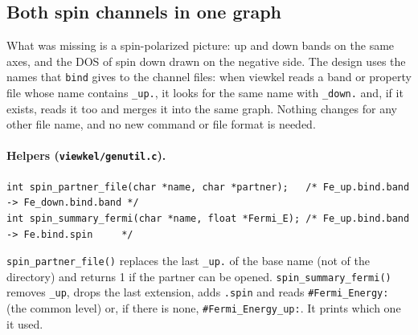 \documentclass[11pt,a4paper]{article}
\newcommand{\file}[1]{\texttt{#1}}
\newcommand{\fn}[1]{\texttt{#1()}}
\begin{document}
\subsection{Both spin channels in one graph}

What was missing is a spin-polarized picture: up and down bands on the same axes, and the
DOS of spin down drawn on the negative side. The design uses the names that
\texttt{bind} gives to the channel files: when viewkel reads a band or property file
whose name contains \texttt{\_up.}, it looks for the same name with \texttt{\_down.} and,
if it exists, reads it too and merges it into the same graph. Nothing changes for any
other file name, and no new command or file format is needed.

\paragraph{Helpers (\file{viewkel/genutil.c}).}
\begin{lstlisting}
int spin_partner_file(char *name, char *partner);   /* Fe_up.bind.band -> Fe_down.bind.band */
int spin_summary_fermi(char *name, float *Fermi_E); /* Fe_up.bind.band -> Fe.bind.spin     */
\end{lstlisting}
\fn{spin\_partner\_file} replaces the last \texttt{\_up.} of the base name (not of the
directory) and returns 1 if the partner can be opened. \fn{spin\_summary\_fermi} removes
\texttt{\_up}, drops the last extension, adds \texttt{.spin} and reads
\texttt{\#Fermi\_Energy:} (the common level) or, if there is none,
\texttt{\#Fermi\_Energy\_up:}. It prints which one it used.
\end{document}

